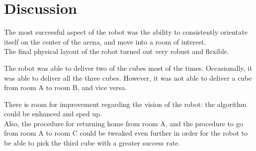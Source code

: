 \section{Discussion}

The most successful aspect of the robot was the ability to consistently orientate itself on the center of the arena, and move into a room of interest.\\
The final physical layout of the robot turned out very robust and flexible.

The robot was able to deliver two of the cubes most of the times. Occasionally, it was able to deliver all the three cubes. However, it was not able to deliver a cube from room A to room B, and vice versa.

There is room for improvement regarding the vision of the robot: the algorithm could be enhanced and sped up.\\
Also, the procedure for returning home from room A, and the procedure to go from room A to room C could be tweaked even further in order for the robot to be able to pick the third cube with a greater success rate.

\newpage
